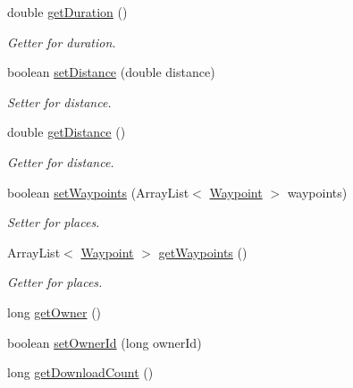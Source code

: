 \begin{DoxyCompactItemize}
double \hyperlink{classuk_1_1ac_1_1swan_1_1digitaltrails_1_1components_1_1_walk_a7f3529dd9a44a3222ded5899c591d93d}{get\+Duration} ()
\begin{DoxyCompactList}\small\item\em Getter for duration. \end{DoxyCompactList}\item 
boolean \hyperlink{classuk_1_1ac_1_1swan_1_1digitaltrails_1_1components_1_1_walk_ade69ef46a5dad1fec92e5db59fe2ea5e}{set\+Distance} (double distance)
\begin{DoxyCompactList}\small\item\em Setter for distance. \end{DoxyCompactList}\item 
double \hyperlink{classuk_1_1ac_1_1swan_1_1digitaltrails_1_1components_1_1_walk_a3652d6a41300005c0084bbd94ccd06ad}{get\+Distance} ()
\begin{DoxyCompactList}\small\item\em Getter for distance. \end{DoxyCompactList}\item 
boolean \hyperlink{classuk_1_1ac_1_1swan_1_1digitaltrails_1_1components_1_1_walk_a1bff1940449a07439fa3036717ad2ff5}{set\+Waypoints} (Array\+List$<$ \hyperlink{classuk_1_1ac_1_1swan_1_1digitaltrails_1_1components_1_1_waypoint}{Waypoint} $>$ waypoints)
\begin{DoxyCompactList}\small\item\em Setter for places. \end{DoxyCompactList}\item 
Array\+List$<$ \hyperlink{classuk_1_1ac_1_1swan_1_1digitaltrails_1_1components_1_1_waypoint}{Waypoint} $>$ \hyperlink{classuk_1_1ac_1_1swan_1_1digitaltrails_1_1components_1_1_walk_a8fc355ae7b253b6e9fa6633f455f207d}{get\+Waypoints} ()
\begin{DoxyCompactList}\small\item\em Getter for places. \end{DoxyCompactList}\item 
long \hyperlink{classuk_1_1ac_1_1swan_1_1digitaltrails_1_1components_1_1_walk_a35821636e7e663c6bad691dc7f541a6c}{get\+Owner} ()
\item 
boolean \hyperlink{classuk_1_1ac_1_1swan_1_1digitaltrails_1_1components_1_1_walk_af248a6e640e79b4afdd938f9de734c40}{set\+Owner\+Id} (long owner\+Id)
\item 
long \hyperlink{classuk_1_1ac_1_1swan_1_1digitaltrails_1_1components_1_1_walk_aa7e76a66244c3f5ad3c4ceccf0d078a7}{get\+Download\+Count} ()

\end{DoxyCompactItemize}
